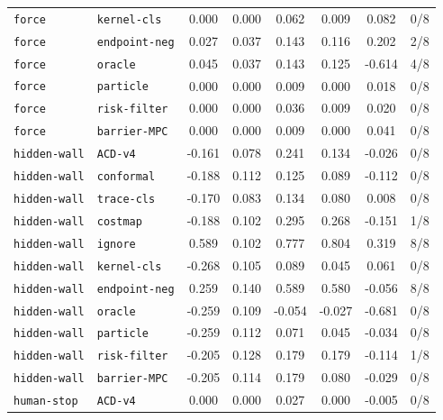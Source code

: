\documentclass{article}
\begin{document}
\begin{center}
{\begin{tabular}{llcccccc}
\texttt{force} & \texttt{kernel-cls} & 0.000 & 0.000 & 0.062 & 0.009 & 0.082 & 0/8 \\
\texttt{force} & \texttt{endpoint-neg} & 0.027 & 0.037 & 0.143 & 0.116 & 0.202 & 2/8 \\
\texttt{force} & \texttt{oracle} & 0.045 & 0.037 & 0.143 & 0.125 & -0.614 & 4/8 \\
\texttt{force} & \texttt{particle} & 0.000 & 0.000 & 0.009 & 0.000 & 0.018 & 0/8 \\
\texttt{force} & \texttt{risk-filter} & 0.000 & 0.000 & 0.036 & 0.009 & 0.020 & 0/8 \\
\texttt{force} & \texttt{barrier-MPC} & 0.000 & 0.000 & 0.009 & 0.000 & 0.041 & 0/8 \\
\texttt{hidden-wall} & \texttt{ACD-v4} & -0.161 & 0.078 & 0.241 & 0.134 & -0.026 & 0/8 \\
\texttt{hidden-wall} & \texttt{conformal} & -0.188 & 0.112 & 0.125 & 0.089 & -0.112 & 0/8 \\
\texttt{hidden-wall} & \texttt{trace-cls} & -0.170 & 0.083 & 0.134 & 0.080 & 0.008 & 0/8 \\
\texttt{hidden-wall} & \texttt{costmap} & -0.188 & 0.102 & 0.295 & 0.268 & -0.151 & 1/8 \\
\texttt{hidden-wall} & \texttt{ignore} & 0.589 & 0.102 & 0.777 & 0.804 & 0.319 & 8/8 \\
\texttt{hidden-wall} & \texttt{kernel-cls} & -0.268 & 0.105 & 0.089 & 0.045 & 0.061 & 0/8 \\
\texttt{hidden-wall} & \texttt{endpoint-neg} & 0.259 & 0.140 & 0.589 & 0.580 & -0.056 & 8/8 \\
\texttt{hidden-wall} & \texttt{oracle} & -0.259 & 0.109 & -0.054 & -0.027 & -0.681 & 0/8 \\
\texttt{hidden-wall} & \texttt{particle} & -0.259 & 0.112 & 0.071 & 0.045 & -0.034 & 0/8 \\
\texttt{hidden-wall} & \texttt{risk-filter} & -0.205 & 0.128 & 0.179 & 0.179 & -0.114 & 1/8 \\
\texttt{hidden-wall} & \texttt{barrier-MPC} & -0.205 & 0.114 & 0.179 & 0.080 & -0.029 & 0/8 \\
\texttt{human-stop} & \texttt{ACD-v4} & 0.000 & 0.000 & 0.027 & 0.000 & -0.005 & 0/8 \\
\bottomrule
\end{tabular}%
}
\end{center}
\end{document}

